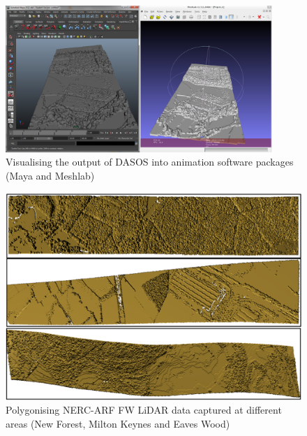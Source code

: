 \documentclass{subfiles}
\begin{document}
  
    \begin{figure} [h!]
    	\centering
    	\includegraphics[width=0.9\textwidth]{img/AimationPackages.png}
    	\caption[Animation Packages]{Visualising the output of DASOS into animation software packages (Maya and Meshlab)}
    	\label{fig:AnimationPackages}
    \end{figure}
 
   \begin{figure} [h!]
   	\centering
   	\includegraphics[width=.8\textwidth]{img/VariousFlightlines}
   	\caption[Various Flightlines Visualisation]{Polygonising NERC-ARF FW LiDAR data captured at different areas (New Forest, Milton Keynes and Eaves Wood)}
   	\label{fig:VariousFlightlines}
   \end{figure}
\end{document}
